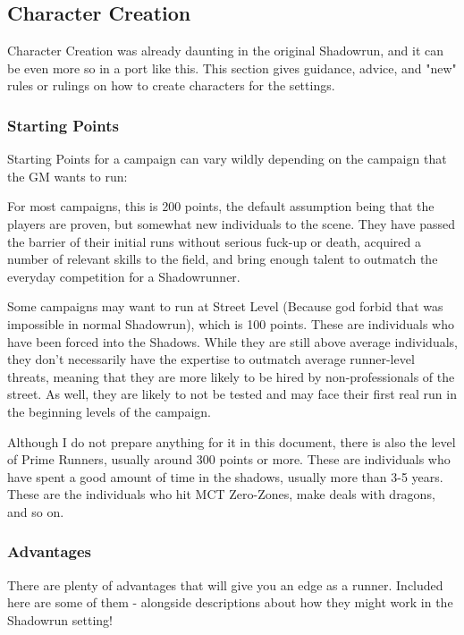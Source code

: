 \begin{multicols*}{3}
	\subsection{Character Creation}
	
	Character Creation was already daunting in the original Shadowrun, and it can be even more so in a port like this. This section gives guidance, advice, and "new" rules or rulings on how to create characters for the settings.
	
	\subsubsection{Starting Points}
	
	Starting Points for a campaign can vary wildly depending on the campaign that the GM wants to run: 
	
	For most campaigns, this is 200 points, the default assumption being that the players are proven, but somewhat new individuals to the scene. They have passed the barrier of their initial runs without serious fuck-up or death, acquired a number of relevant skills to the field, and bring enough talent to outmatch the everyday competition for a Shadowrunner.
	
	Some campaigns may want to run at Street Level (Because god forbid that was impossible in normal Shadowrun), which is 100 points. These are individuals who have been forced into the Shadows. While they are still above average individuals, they don't necessarily have the expertise to outmatch average runner-level threats, meaning that they are more likely to be hired by non-professionals of the street. As well, they are likely to not be tested and may face their first real run in the beginning levels of the campaign.
	
	Although I do not prepare anything for it in this document, there is also the level of Prime Runners, usually around 300 points or more. These are individuals who have spent a good amount of time in the shadows, usually more than 3-5 years. These are the individuals who hit MCT Zero-Zones, make deals with dragons, and so on.
	
	\subsubsection{Advantages}
	
	There are plenty of  advantages that will give you an edge as a runner. Included here are some of them - alongside descriptions about how they might work in the Shadowrun setting!
	

\end{multicols*}
